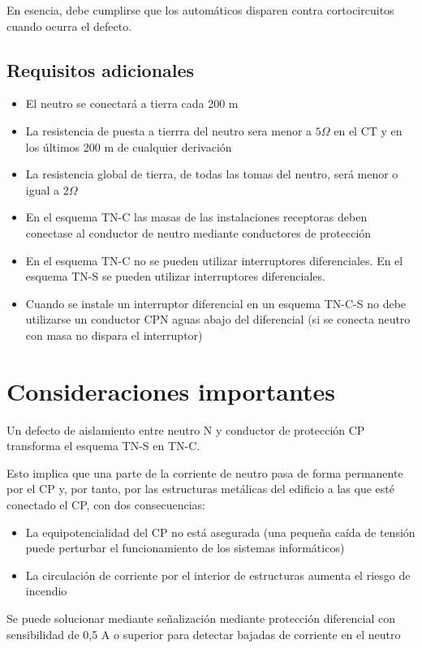 En esencia, debe cumplirse que los automáticos disparen contra cortocircuitos cuando ocurra el defecto.

\subsection{Requisitos adicionales}
\begin{itemize}
	\item El neutro se conectará a tierra cada 200 m
	\item La resistencia de puesta a tierrra del neutro sera menor a $5\Omega$ en el CT y en los últimos 200 m de cualquier derivación
	\item La resistencia global de tierra, de todas las tomas del neutro, será menor o igual a $2\Omega$
	\item En el esquema TN-C las masas de las instalaciones receptoras deben conectase al
	conductor de neutro mediante conductores de protección
	\item En el esquema TN-C no se pueden utilizar interruptores diferenciales. En el esquema TN-S se pueden utilizar interruptores diferenciales.
	\item Cuando se instale un interruptor diferencial en un esquema TN-C-S no debe utilizarse un conductor
	CPN aguas abajo del diferencial (si se conecta neutro con masa no dispara el interruptor)
\end{itemize}
\section{Consideraciones importantes}
Un defecto de aislamiento entre neutro N y conductor de protección CP
transforma el esquema TN-S en TN-C. 
\newline

Esto implica que una parte de la corriente de neutro pasa de forma permanente por el
CP y, por tanto, por las estructuras metálicas del edificio a las que esté conectado el CP,
con dos consecuencias:
\begin{itemize}
	\item La equipotencialidad del CP no está asegurada
	(una pequeña caída de tensión puede perturbar
	el funcionamiento de los sistemas informáticos)
	\item La circulación de corriente por el interior de
	estructuras aumenta el riesgo de incendio
\end{itemize}

Se puede solucionar mediante señalización mediante protección diferencial con sensibilidad de
0,5 A o superior para detectar bajadas de corriente en el neutro
